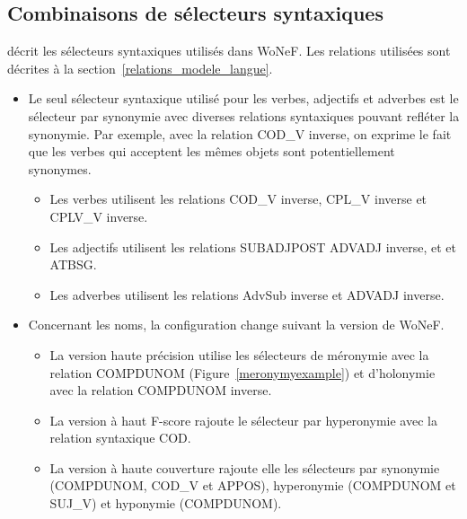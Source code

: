 \documentclass[oneside,parskip]{scrbook}
\begin{document}
\subsection{Combinaisons de sélecteurs syntaxiques}

\cite[section 3.1.1.3]{mouton2010phd} décrit les sélecteurs syntaxiques
utilisés dans WoNeF. Les relations utilisées sont décrites à la
section~\ref{relations_modele_langue}.

\begin{itemize}
    \item Le seul sélecteur syntaxique utilisé pour les verbes, adjectifs et
        adverbes est le sélecteur par synonymie avec diverses relations
        syntaxiques pouvant refléter la synonymie. Par exemple, avec la
        relation COD\_V inverse, on exprime le fait que les verbes qui acceptent
        les mêmes objets sont potentiellement synonymes.
        \begin{itemize}
            \item Les verbes utilisent les relations COD\_V inverse, CPL\_V
                inverse et CPLV\_V inverse.
            \item Les adjectifs utilisent les relations SUBADJPOST ADVADJ
                inverse, et et ATBSG.
            \item Les adverbes utilisent les relations AdvSub inverse et ADVADJ
                inverse.
        \end{itemize}
    \item Concernant les noms, la configuration change suivant la version de WoNeF.
        \begin{itemize}
            \item La version haute précision utilise les sélecteurs de
                méronymie avec la relation COMPDUNOM
                (Figure~\ref{meronymyexample}) et d'holonymie avec la relation
                COMPDUNOM inverse.
            \item La version à haut F-score rajoute le sélecteur par
                hyperonymie avec la relation syntaxique COD.
            \item La version à haute couverture rajoute elle les sélecteurs
                par synonymie (COMPDUNOM, COD\_V et APPOS), hyperonymie
                (COMPDUNOM et SUJ\_V) et hyponymie (COMPDUNOM).
        \end{itemize}
\end{itemize}


\end{document}
